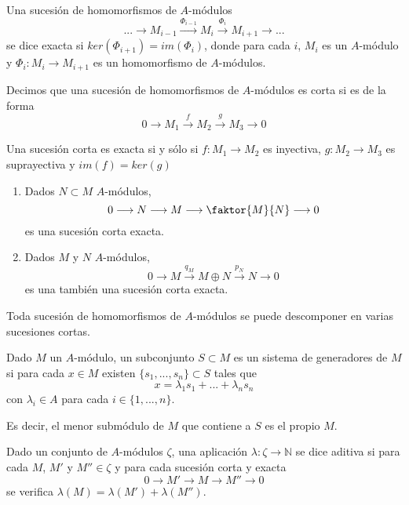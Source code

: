 \documentclass[../main.tex]{subfiles}
\begin{document}
\begin{definition} Una sucesión de homomorfismos de $A$-módulos$$...\longrightarrow M_{i-1}\overset{\Phi_{i-1}}{\longrightarrow} M_i\overset{\Phi_i}{\longrightarrow}M_{i+1}\longrightarrow...$$ se dice exacta si $ker(\Phi_{i+1})=im(\Phi_i)$, donde para cada $i$, $M_i$ es un $A$-módulo y $\Phi_i:M_i\rightarrow M_{i+1}$ es un homomorfismo de $A$-módulos.
\end{definition}
\begin{definition} Decimos que una sucesión de homomorfismos de $A$-módulos es corta si es de la forma$$0\longrightarrow M_1\overset{f}{\longrightarrow} M_2\overset{g}{\longrightarrow} M_3\longrightarrow 0$$
\end{definition}
\begin{remark} Una sucesión corta es exacta si y sólo si $f:M_1\rightarrow M_2$ es inyectiva, $g:M_2\rightarrow M_3$ es suprayectiva y $im(f)=ker(g)$
\end{remark}
\begin{example}
  \begin{enumerate}
    \item Dados $N\subset M$ $A$-módulos,$$0\longrightarrow N\longrightarrow M\longrightarrow\faktor{M}{N}\longrightarrow 0$$ es una sucesión corta exacta.

    \item Dados $M$ y $N$ $A$-módulos,$$0\longrightarrow M\overset{q_M}{\longrightarrow} M\oplus N\overset{p_N}{\longrightarrow} N\longrightarrow 0$$ es una también una sucesión corta exacta.
  \end{enumerate}
\end{example}
\begin{remark} Toda sucesión de homomorfismos de $A$-módulos se puede descomponer en varias sucesiones cortas.
\end{remark}
\begin{definition} Dado $M$ un $A$-módulo, un subconjunto $S\subset M$ es un sistema de generadores de $M$ si para cada $x\in M$ existen $\{s_1,...,s_n\}\subset S$ tales que$$x=\lambda_1s_1+...+\lambda_ns_n$$ con $\lambda_i\in A$ para cada $i\in\{1,...,n\}$.

	Es decir, el menor submódulo de $M$ que contiene a $S$ es el propio $M$.
\end{definition}
\begin{definition} Dado un conjunto de $A$-módulos $\zeta$, una aplicación $\lambda:\zeta\rightarrow\mathbb{N}$ se dice aditiva si para cada $M$, $M'$ y $M''\in\zeta$ y para cada sucesión corta y exacta$$0\longrightarrow M'\longrightarrow M\longrightarrow M''\longrightarrow 0$$ se verifica $\lambda(M) = \lambda(M')+\lambda(M'')$.
\end{definition}
\end{document}
